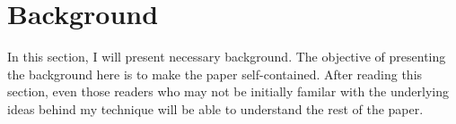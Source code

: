 \section{Background}
\label{sec:background}

In this section, I will present necessary background.
The objective of presenting the background here is to 
make the paper self-contained. 
After reading this section, even those readers who may
not be initially familar with the underlying ideas 
behind my technique will be able to understand the rest
of the paper. 
